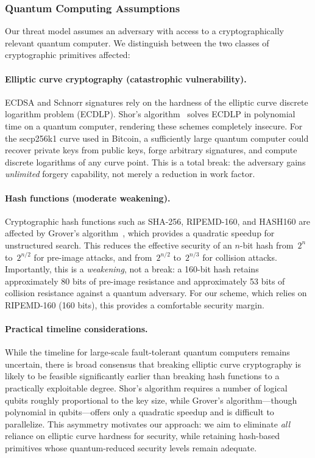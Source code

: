 \documentclass[11pt, a4paper]{article}
\begin{document}
\subsubsection{Quantum Computing Assumptions}
\label{sec:quantum-assumptions}

Our threat model assumes an adversary with access to a cryptographically relevant quantum computer. We distinguish between the two classes of cryptographic primitives affected:

\paragraph{Elliptic curve cryptography (catastrophic vulnerability).}
ECDSA and Schnorr signatures rely on the hardness of the elliptic curve discrete logarithm problem (ECDLP). Shor's algorithm~\cite{shor1994} solves ECDLP in polynomial time on a quantum computer, rendering these schemes completely insecure. For the secp256k1 curve used in Bitcoin, a sufficiently large quantum computer could recover private keys from public keys, forge arbitrary signatures, and compute discrete logarithms of any curve point. This is a total break: the adversary gains \emph{unlimited} forgery capability, not merely a reduction in work factor.

\paragraph{Hash functions (moderate weakening).}
Cryptographic hash functions such as SHA-256, RIPEMD-160, and HASH160 are affected by Grover's algorithm~\cite{grover1996}, which provides a quadratic speedup for unstructured search. This reduces the effective security of an $n$-bit hash from~$2^n$ to~$2^{n/2}$ for pre-image attacks, and from~$2^{n/2}$ to~$2^{n/3}$ for collision attacks. Importantly, this is a \emph{weakening}, not a break: a 160-bit hash retains approximately 80 bits of pre-image resistance and approximately 53 bits of collision resistance against a quantum adversary. For our scheme, which relies on RIPEMD-160 (160 bits), this provides a comfortable security margin.

\paragraph{Practical timeline considerations.}
While the timeline for large-scale fault-tolerant quantum computers remains uncertain, there is broad consensus that breaking elliptic curve cryptography is likely to be feasible significantly earlier than breaking hash functions to a practically exploitable degree. Shor's algorithm requires a number of logical qubits roughly proportional to the key size, while Grover's algorithm---though polynomial in qubits---offers only a quadratic speedup and is difficult to parallelize. This asymmetry motivates our approach: we aim to eliminate \emph{all} reliance on elliptic curve hardness for security, while retaining hash-based primitives whose quantum-reduced security levels remain adequate.
\end{document}
